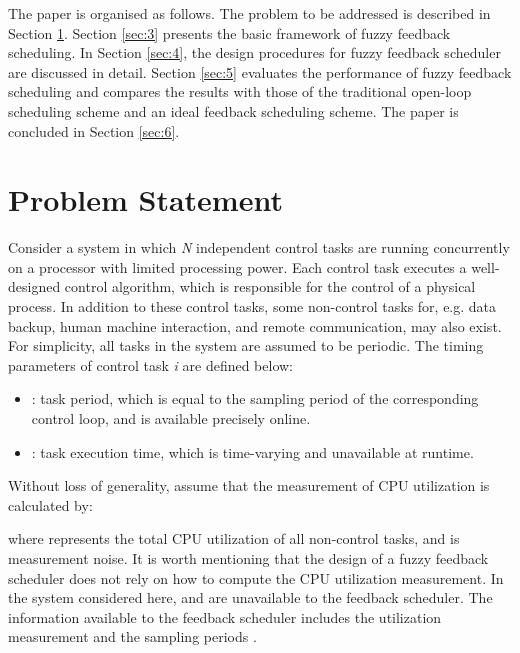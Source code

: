 \documentclass[12pt,a4paper]{ijicic}
\begin{document}
The paper is organised as follows. The problem to be addressed is
described in Section \ref{sec:2}. Section \ref{sec:3} presents the basic framework of
fuzzy feedback scheduling. In Section \ref{sec:4}, the design procedures for
fuzzy feedback scheduler are discussed in detail. Section \ref{sec:5}
evaluates the performance of fuzzy feedback scheduling and compares
the results with those of the traditional open-loop scheduling
scheme and an ideal feedback scheduling scheme. The paper is
concluded in Section \ref{sec:6}.

\section{Problem Statement}
\label{sec:2}

Consider a system in which \emph{N} independent control tasks are
running concurrently on a processor with limited processing power.
Each control task executes a well-designed control algorithm, which
is responsible for the control of a physical process. In addition to
these control tasks, some non-control tasks for, e.g. data backup,
human machine interaction, and remote communication, may also
exist. For simplicity, all tasks in the system are assumed to be
periodic. The timing parameters of control task \emph{i} are defined
below:
\begin{itemize}
\item : task period, which is equal to the sampling period of the
corresponding control loop, and is available precisely online.
\item : task execution time, which is time-varying and unavailable at runtime.
\end{itemize}

Without loss of generality, assume that the measurement of CPU
utilization is calculated by:

where  represents the total CPU utilization of all
non-control tasks, and  is measurement noise. It is worth
mentioning that the design of a fuzzy feedback scheduler does not
rely on how to compute the CPU utilization measurement. In the
system considered here,  and  are unavailable to
the feedback scheduler. The information available to the feedback
scheduler includes the utilization measurement  and the
sampling periods .
\end{document}
